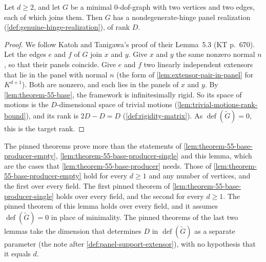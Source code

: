 \begin{lemma}
  \label{lem:theorem-55-base-producer-parallel}
  \leanok
  Let $d \ge 2$, and let $G$ be a minimal $0$-dof-graph with two vertices
  and two edges, each of which joins them. Then $G$ has a
  nondegenerate-hinge panel realization
  (\cref{def:genuine-hinge-realization}), of rank $D$.
\end{lemma}
\begin{proof}
  \leanok
  We follow Katoh and Tanigawa's proof of their Lemma~5.3 (KT p.~670).
  Let the edges $e$ and $f$ of $G$ join $x$ and $y$. Give $x$ and $y$ the
  same nonzero normal $n$, so that their panels coincide. Give $e$ and $f$
  two linearly independent extensors that lie in the panel with normal
  $n$ (the form of \cref{lem:extensor-pair-in-panel} for $K^{d+1}$). Both
  are nonzero, and each lies in the panels of $x$ and $y$. By
  \cref{lem:theorem-55-base}, the framework is infinitesimally rigid. So
  its space of motions is the $D$-dimensional space of trivial motions
  (\cref{lem:trivial-motions-rank-bound}), and its rank is $2D - D = D$
  (\cref{def:rigidity-matrix}). As $\operatorname{def}(\tilde G) = 0$,
  this is the target rank.
\end{proof}

\begin{fmlnote}
  The pinned theorems prove more than the statements of
  \cref{lem:theorem-55-base-producer-empty},
  \cref{lem:theorem-55-base-producer-single} and this lemma, which are
  the cases that \cref{lem:theorem-55-base-producer} needs. Those of
  \cref{lem:theorem-55-base-producer-empty} hold for every $d \ge 1$ and
  any number of vertices, and the first over every field. The first
  pinned theorem of \cref{lem:theorem-55-base-producer-single} holds over
  every field, and the second for every $d \ge 1$. The pinned theorem of
  this lemma holds over every field, and it assumes
  $\operatorname{def}(\tilde G) = 0$ in place of minimality. The pinned
  theorems of the last two lemmas take the dimension that determines $D$
  in $\operatorname{def}(\tilde G)$ as a separate parameter (the note
  after \cref{def:panel-support-extensor}), with no hypothesis that it
  equals $d$.
\end{fmlnote}

